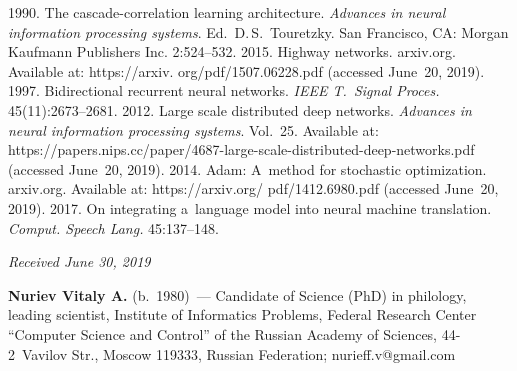 \begin{multicols}{2}
{{\begin{thebibliography}{99}
   1990. The cascade-correlation learning 
architecture. \textit{Advances in neural information processing systems}. Ed.\ 
D.\,S.~Touretzky. San Francisco, CA: Morgan Kaufmann Publishers Inc. 2:524--532.
  \bibitem{21-nur-1}
   2015. Highway 
networks. arxiv.org.
Available at: {\sf https://arxiv. org/pdf/1507.06228.pdf} (accessed June~20, 
2019).
   1997. Bidirectional recurrent neural 
networks. \textit{IEEE T.~Signal Proces.} 45(11):2673--2681.
   2012. 
Large scale distributed deep networks. \textit{Advances in neural information 
processing systems}. Vol.~25. Available at:  
{\sf https://papers.nips.cc/paper/4687-large-scale-distributed-deep-networks.pdf} 
(accessed June~20, 2019).
   2014. Adam: A~method for stochastic 
optimization. arxiv.org. Available at: {\sf https://arxiv.org/ pdf/1412.6980.pdf} (accessed 
June~20, 2019).
   2017. On 
integrating a~language model into neural machine translation. \textit{Comput. 
Speech Lang.} 45:137--148.
 \end{thebibliography}

 }
 }

\end{multicols}


\hfill{\small\textit{Received June 30, 2019}}


 
  
  \Contrl
  
  \noindent
  \textbf{Nuriev Vitaly A.} (b.\ 1980)~--- Candidate of Science (PhD) in philology, 
leading scientist, Institute of Informatics Problems, Federal Research Center 
``Computer Science and Control'' of the Russian Academy of Sciences, 44-2~Vavilov 
Str., Moscow 119333, Russian Federation; \mbox{nurieff.v@gmail.com}



\label{end\stat}

\renewcommand{\bibname}{\protect\rm Литература}